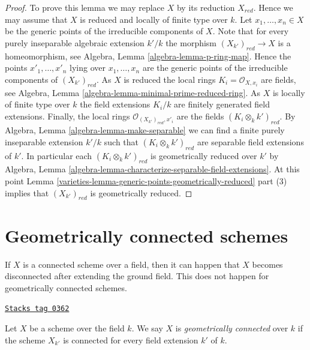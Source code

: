 \begin{proof}

To prove this lemma we may replace $X$ by its reduction $X_{red}$.
Hence we may assume that $X$ is reduced and locally of finite type
over $k$.
Let $x_1, \ldots, x_n \in X$ be the generic points of the irreducible
components of $X$.
Note that for every purely inseparable algebraic extension $k'/k$
the morphism $(X_{k'})_{red} \to X$ is a homeomorphism, see
Algebra, Lemma \ref{algebra-lemma-p-ring-map}. Hence the points
$x'_1, \ldots, x'_n$ lying over $x_1, \ldots, x_n$ are the generic
points of the irreducible components of $(X_{k'})_{red}$.
As $X$ is reduced the local rings $K_i = \mathcal{O}_{X, x_i}$ are fields, see
Algebra, Lemma \ref{algebra-lemma-minimal-prime-reduced-ring}.
As $X$ is locally of finite type over $k$ the field extensions
$K_i/k$ are finitely generated field extensions.
Finally, the local rings $\mathcal{O}_{(X_{k'})_{red}, x'_i}$ are the
fields $(K_i \otimes_k k')_{red}$. By
Algebra, Lemma \ref{algebra-lemma-make-separable}
we can find a finite purely inseparable extension $k'/k$
such that $(K_i \otimes_k k')_{red}$ are separable field
extensions of $k'$. In particular each $(K_i \otimes_k k')_{red}$
is geometrically reduced over $k'$ by
Algebra, Lemma \ref{algebra-lemma-characterize-separable-field-extensions}.
At this point
Lemma \ref{varieties-lemma-generic-points-geometrically-reduced} part (3)
implies that $(X_{k'})_{red}$ is geometrically reduced.
\end{proof}

\section{Geometrically connected schemes}
\label{varieties-section-geometrically-connected}
If $X$ is a connected scheme over a field, then it can happen that $X$
becomes disconnected after extending the ground field. This does not happen
for geometrically connected schemes.

\begin{definition}
\label{varieties-definition-geometrically-connected}
\href{https://stacks.math.columbia.edu/tag/0362}{\texttt{Stacks tag 0362}}

Let $X$ be a scheme over the field $k$. We say $X$ is
{\it geometrically connected} over $k$ if the scheme $X_{k'}$ is connected
for every field extension $k'$ of $k$.
\end{definition}

